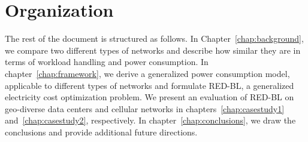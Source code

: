 \section{Organization} The rest of the document is structured as follows. In Chapter~\ref{chap:background}, we compare two different types of networks and describe how similar they are in terms of workload handling and power consumption. In chapter~\ref{chap:framework}, we derive a generalized power consumption model, applicable to different types of networks and formulate RED-BL, a generalized electricity cost optimization problem. We present an evaluation of RED-BL on geo-diverse data centers and cellular networks in chapters~\ref{chap:casestudy1} and~\ref{chap:casestudy2}, respectively. In chapter~\ref{chap:conclusions}, we draw the conclusions and provide additional future directions.